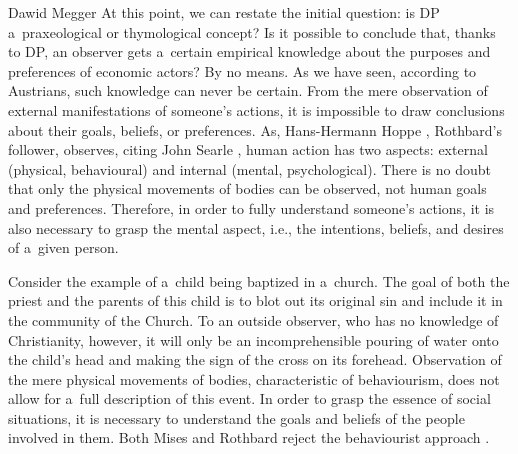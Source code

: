 \begin{artengenv}{Dawid Megger}
At this point, we can restate the initial question: is DP a~praxeological or thymological concept? Is it possible to conclude that, thanks to DP, an observer gets a~certain empirical knowledge about the purposes and preferences of economic actors? By no means. As we have seen, according to Austrians, such knowledge can never be certain. From the mere observation of external manifestations of someone's actions, it is impossible to draw conclusions about their goals, beliefs, or preferences. As, Hans-Hermann Hoppe 
\parencite*[][]{hoppe_note_2005}, %
 Rothbard's follower, observes, citing John Searle 
\parencite*[][pp.57–58]{searle_minds_1984}, %
 human action has two aspects: external (physical, behavioural) and internal (mental, psychological). There is no doubt that only the physical movements of bodies can be observed, not human goals and preferences. Therefore, in order to fully understand someone's actions, it is also necessary to grasp the mental aspect, i.e., the intentions, beliefs, and desires of a~given person.



Consider the example of a~child being baptized in a~church. The goal of both the priest and the parents of this child is to blot out its original sin and include it in the community of the Church. To an outside observer, who has no knowledge of Christianity, however, it will only be an incomprehensible pouring of water onto the child's head and making the sign of the cross on its forehead. Observation of the mere physical movements of bodies, characteristic of behaviourism, does not allow for a~full description of this event. In order to grasp the essence of social situations, it is necessary to understand the goals and beliefs of the people involved in them. Both Mises and Rothbard reject the behaviourist approach 
\parencites[cf.][]{mises_theory_2007}[][]{rothbard_present_2011}.%





\end{artengenv}
